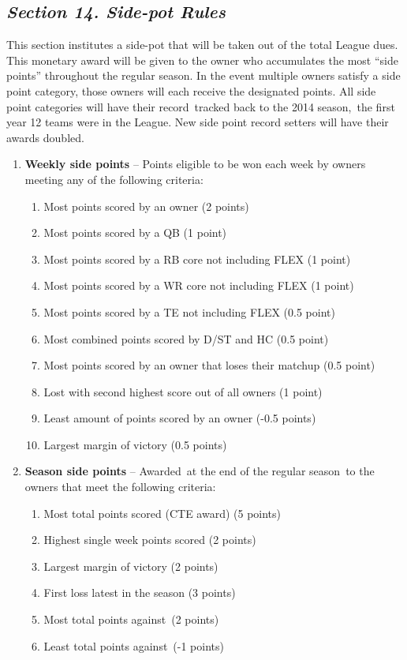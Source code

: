 \documentclass{article}
\begin{document}
    \subsection{\textit{Section 14. Side-pot Rules}}
    This section institutes a side-pot that will be taken out of the total League dues. This monetary award will be given to the owner who accumulates the most “side points” throughout the regular season. In the event multiple owners satisfy a side point category, those owners will each receive the designated points. All side point categories will have their record tracked back to the 2014 season, the first year 12 teams were in the League. New side point record setters will have their awards doubled.
    \begin{enumerate}[label=\Alph*)]
        \item\textbf{Weekly side points} – Points eligible to be won each week by owners meeting any of the following criteria:
        \begin{enumerate}[label=\roman*)]
            \item Most points scored by an owner (2 points)
            \item Most points scored by a QB (1 point)
            \item Most points scored by a RB core not including FLEX (1 point)
            \item Most points scored by a WR core not including FLEX (1 point)
            \item Most points scored by a TE not including FLEX (0.5 point)
            \item Most combined points scored by D/ST and HC (0.5 point)
            \item Most points scored by an owner that loses their matchup (0.5 point)
            \item Lost with second highest score out of all owners (1 point)
            \item Least amount of points scored by an owner (-0.5 points)
            \item Largest margin of victory (0.5 points)
        \end{enumerate}
        \item\textbf{Season side points} – Awarded at the end of the regular season to the owners that meet the following criteria:
        \begin{enumerate}[label=\roman*)]
            \item Most total points scored (CTE award) (5 points)
            \item Highest single week points scored (2 points)
            \item Largest margin of victory (2 points)
            \item First loss latest in the season (3 points)
            \item Most total points against (2 points)
            \item Least total points against (-1 points)
        \end{enumerate}
    \end{enumerate}
\end{document}
